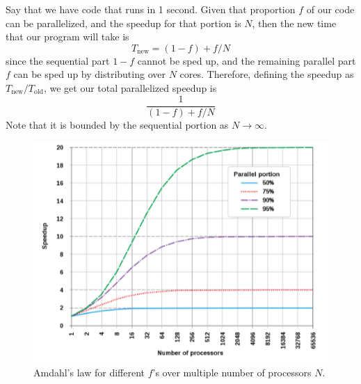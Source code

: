 \documentclass{article}
\begin{document}
    \begin{theorem}
      Say that we have code that runs in 1 second. Given that proportion $f$ of our code can be parallelized, and the speedup for that portion is $N$, then the new time that our program will take is 
      \begin{equation}
        T_{\mathrm{new}} = (1 - f) + f/N
      \end{equation}
      since the sequential part $1 - f$ cannot be sped up, and the remaining parallel part $f$ can be sped up by distributing over $N$ cores. Therefore, defining the speedup as $T_{\mathrm{new}} / T_{\mathrm{old}}$, we get our total parallelized speedup is 
      \begin{equation}
        \frac{1}{(1 - f) + f/N}
      \end{equation}
      Note that it is bounded by the sequential portion as $N \rightarrow \infty$. 
      \begin{figure}[H]
        \centering 
        \includegraphics[scale=0.5]{img/amdahl.png}
        \caption{Amdahl's law for different $f$'s over multiple number of processors $N$.} 
        \label{fig:amdahl}
      \end{figure}
    \end{theorem}
\end{document}
